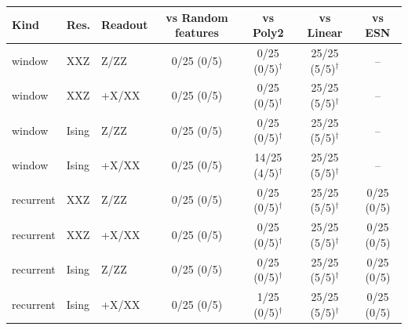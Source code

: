 \begin{tabular}{lllcccc}
\toprule
Kind & Res. & Readout & vs Random features & vs Poly2 & vs Linear & vs ESN \\
\midrule
window & XXZ & Z/ZZ & 0/25 (0/5) & 0/25 (0/5)$^\dagger$ & 25/25 (5/5)$^\dagger$ & -- \\
window & XXZ & +X/XX & 0/25 (0/5) & 0/25 (0/5)$^\dagger$ & 25/25 (5/5)$^\dagger$ & -- \\
window & Ising & Z/ZZ & 0/25 (0/5) & 0/25 (0/5)$^\dagger$ & 25/25 (5/5)$^\dagger$ & -- \\
window & Ising & +X/XX & 0/25 (0/5) & 14/25 (4/5)$^\dagger$ & 25/25 (5/5)$^\dagger$ & -- \\
\midrule
recurrent & XXZ & Z/ZZ & 0/25 (0/5) & 0/25 (0/5)$^\dagger$ & 25/25 (5/5)$^\dagger$ & 0/25 (0/5) \\
recurrent & XXZ & +X/XX & 0/25 (0/5) & 0/25 (0/5)$^\dagger$ & 25/25 (5/5)$^\dagger$ & 0/25 (0/5) \\
recurrent & Ising & Z/ZZ & 0/25 (0/5) & 0/25 (0/5)$^\dagger$ & 25/25 (5/5)$^\dagger$ & 0/25 (0/5) \\
recurrent & Ising & +X/XX & 0/25 (0/5) & 1/25 (0/5)$^\dagger$ & 25/25 (5/5)$^\dagger$ & 0/25 (0/5) \\
\bottomrule
\end{tabular}
